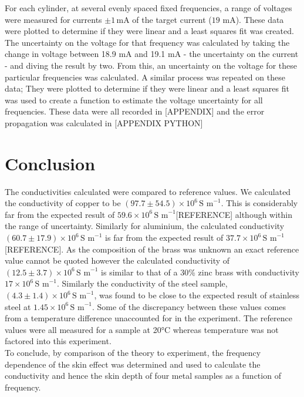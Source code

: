 \documentclass[a4paper,12pt,twocolumn]{article}
\begin{document}
	For each cylinder, at several evenly spaced fixed frequencies, a range of voltages were measured for currents $\pm 1 \,\text{mA}$ of the target current ($19$ mA). These data were plotted to determine if they were linear and a least squares fit was created. The uncertainty on the voltage for that frequency was calculated by taking the change in voltage between 18.9 mA and 19.1 mA - the uncertainty on the current - and diving the result by two. From this, an uncertainty on the voltage for these particular frequencies was calculated. A similar process was repeated on these data; They were plotted to determine if they were linear and a least squares fit was used to create a function to estimate the voltage uncertainty for all frequencies. These data were all recorded in [APPENDIX] and the error propagation was calculated in [APPENDIX PYTHON]\\
	

\section{Conclusion}
	The conductivities calculated were compared to reference values. We calculated the conductivity of copper to be $(97.7 \pm 54.5) \times 10^6 \,\text{S m}^{-1}$. This is considerably far from the expected result of $59.6 \times 10^6 \,\text{S m}^{-1}$[REFERENCE] although within the range of uncertainty. Similarly for aluminium, the calculated conductivity $(60.7 \pm 17.9) \times 10^6 \,\text{S m}^{-1}$ is far from the expected result of $37.7 \times 10^6 \,\text{S m}^{-1}$ [REFERENCE]. As the composition of the brass was unknown an exact reference value cannot be quoted however the calculated conductivity of $(12.5 \pm 3.7) \times 10^6\,\text{S m}^{-1}$ is similar to that of a 30\% zinc brass with conductivity $17 \times 10^6 \,\text{S m}^{-1}$. Similarly the conductivity of the steel sample, $(4.3 \pm 1.4) \times 10^6 \,\text{S m}^{-1}$, was found to be close to the expected result of stainless steel at $1.45 \times 10^6 \,\text{S m}^{-1}$. Some of the discrepancy between these values comes from a temperature difference unaccounted for in the experiment. The reference values were all measured for a sample at 20°C whereas temperature was not factored into this experiment. \\
	
	To conclude, by comparison of the theory to experiment, the frequency dependence of the skin effect was determined and used to calculate the conductivity and hence the skin depth of four metal samples as a function of frequency.\\
	
\end{document}
